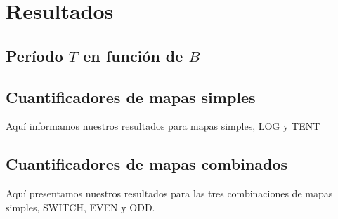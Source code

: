 \section{Resultados}\label{sec:resultados}



\subsection{Período $T$ en función de $B$}



\subsection {Cuantificadores de mapas simples}\label{subsec:SimpleMaps}
Aquí informamos nuestros resultados para mapas simples, LOG y TENT



 

\subsection{Cuantificadores de mapas combinados}\label{subsec:SecSwitch}
Aquí presentamos nuestros resultados para las tres combinaciones de mapas simples, SWITCH, EVEN y ODD.



